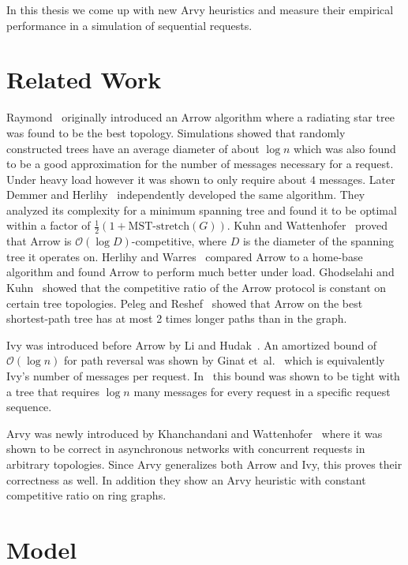 \documentclass[a4paper, oneside]{discothesis}
\begin{document}
In this thesis we come up with new Arvy heuristics and measure their empirical performance in a simulation of sequential requests.

\section{Related Work}

Raymond~\cite{Ray} originally introduced an Arrow algorithm where a radiating star tree was found to be the best topology. Simulations showed that randomly constructed trees have an average diameter of about $\log n$ which was also found to be a good approximation for the number of messages necessary for a request. Under heavy load however it was shown to only require about $4$ messages. Later Demmer and Herlihy~\cite{Arrow} independently developed the same algorithm. They analyzed its complexity for a minimum spanning tree and found it to be optimal within a factor of $\frac{1}{2}(1+\text{MST-stretch}(G))$. Kuhn and Wattenhofer~\cite{Kuhn} proved that Arrow is $\mathcal{O}(\log D)$-competitive, where $D$ is the diameter of the spanning tree it operates on. Herlihy and Warres~\cite{Tale} compared Arrow to a home-base algorithm and found Arrow to perform much better under load. Ghodselahi and Kuhn~\cite{Ghod} showed that the competitive ratio of the Arrow protocol is constant on certain tree topologies. Peleg and Reshef~\cite{Peleg} showed that Arrow on the best shortest-path tree has at most 2 times longer paths than in the graph.

Ivy was introduced before Arrow by Li and Hudak~\cite{Ivy}. An amortized bound of $\mathcal{O}(\log n)$ for path reversal was shown by Ginat et~al.~\cite{Ginat} which is equivalently Ivy's number of messages per request. In~\cite{Distr} this bound was shown to be tight with a tree that requires $\log n$ many messages for every request in a specific request sequence.

Arvy was newly introduced by Khanchandani and Wattenhofer~\cite{Arvy} where it was shown to be correct in asynchronous networks with concurrent requests in arbitrary topologies. Since Arvy generalizes both Arrow and Ivy, this proves their correctness as well. In addition they show an Arvy heuristic with constant competitive ratio on ring graphs.

\section{Model}\label{model}
\end{document}
